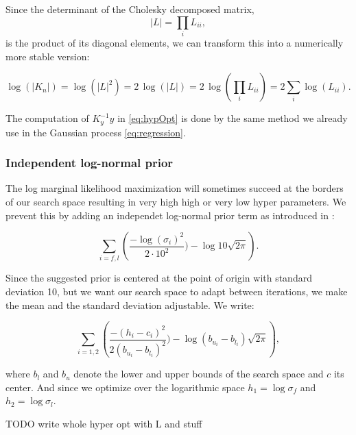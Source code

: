 Since the determinant of the Cholesky decomposed matrix,
$$|L| = \textstyle\prod_{i} L_{ii},$$
is the product of its diagonal elements, we can transform this into a numerically more stable version:

$$\log(|K_n|) = \log(|L|^{2}) = 2\,\log(|L|) = 2\,\log(\textstyle\prod_{i} L_{ii}) = 2\textstyle\sum_{i} \log(L_{ii}).$$

The computation of $K_y^{-1}y$ in \eqref{eq:hypOpt} is done by the same method we already use in the Gaussian process \eqref{eq:regression}.

\subsubsection{Independent log-normal prior}
The log marginal likelihood maximization will sometimes succeed at the borders of our search space resulting in very high high or very low hyper parameters. We prevent this by adding an independet log-normal prior term as introduced in \cite{lizotte2008practical}:

$$\sum_{i=f,l}\left(\frac{-\log(\sigma_i)^2}{2\cdot 10^2}) - \log 10\sqrt{2\pi} \right).$$

Since the suggested prior is centered at the point of origin with standard deviation 10, but we want our search space to adapt between iterations, we make the mean and the standard deviation adjustable. We write:

$$\sum_{i=1,2}\left(\frac{-(h_i-c_i)^2}{2(b_{u_i}-b_{l_i})^2}) - \log(b_{u_i}-b_{l_i})\sqrt{2\pi} \right),$$

where $b_l$ and $b_u$ denote the lower and upper bounds of the search space and $c$ its center. And since we optimize over the logarithmic space $h_1 = \log\sigma_f$ and $h_2 = \log\sigma_l$.


TODO write whole hyper opt with L and stuff
